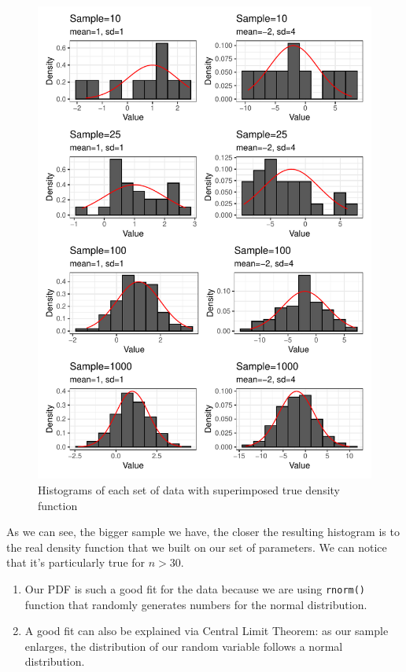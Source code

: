 \documentclass{article}\usepackage[]{graphicx}\usepackage[]{color}
\makeatletter
\def\maxwidth{ %
  \ifdim\Gin@nat@width>\linewidth
    \linewidth
  \else
    \Gin@nat@width
  \fi
}
\newenvironment{knitrout}{}{} %
\makeatother
\begin{document}
\begin{enumerate}
\begin{enumerate}
\begin{figure}[H]
\begin{center}
\begin{knitrout}
\color{fgcolor}
\includegraphics[width=\maxwidth]{figure/unnamed-chunk-5-1} 
\end{knitrout}
	\caption{Histograms of each set of data with superimposed true density function}
\label{plot3} %
\end{center}
\end{figure}
As we can see, the bigger sample we have, the closer the resulting histogram is to the real density function that we built on our set of parameters. We can notice that it's particularly true for $n>30$.\\
\begin{enumerate}
  \item Our PDF is such a good fit for the data because we are using \texttt{rnorm()} function that randomly generates numbers for the normal distribution. 
  \item A good fit can also be explained via Central Limit Theorem: as our sample enlarges, the distribution of our random variable follows a normal distribution.
\end{enumerate}
  

\end{enumerate}
\end{enumerate}
\end{document}
